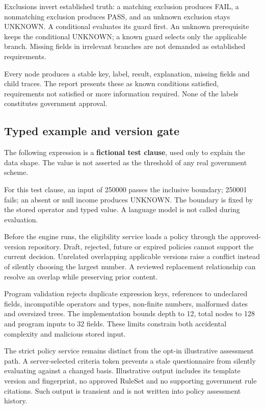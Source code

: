 \documentclass[12pt,a4paper,twoside]{report}
\begin{document}
Exclusions invert established truth: a matching exclusion produces FAIL, a nonmatching exclusion produces PASS, and an unknown exclusion stays UNKNOWN. A conditional evaluates its guard first. An unknown prerequisite keeps the conditional UNKNOWN; a known guard selects only the applicable branch. Missing fields in irrelevant branches are not demanded as established requirements.

Every node produces a stable key, label, result, explanation, missing fields and child traces. The report presents these as known conditions satisfied, requirements not satisfied or more information required. None of the labels constitutes government approval.

\subsection*{Typed example and version gate}

The following expression is a \textbf{fictional test clause}, used only to explain the data shape. The value is not asserted as the threshold of any real government scheme.

For this test clause, an input of 250000 passes the inclusive boundary; 250001 fails; an absent or null income produces UNKNOWN. The boundary is fixed by the stored operator and typed value. A language model is not called during evaluation.

Before the engine runs, the eligibility service loads a policy through the approved-version repository. Draft, rejected, future or expired policies cannot support the current decision. Unrelated overlapping applicable versions raise a conflict instead of silently choosing the largest number. A reviewed replacement relationship can resolve an overlap while preserving prior content.

Program validation rejects duplicate expression keys, references to undeclared fields, incompatible operators and types, non-finite numbers, malformed dates and oversized trees. The implementation bounds depth to 12, total nodes to 128 and program inputs to 32 fields. These limits constrain both accidental complexity and malicious stored input.

The strict policy service remains distinct from the opt-in illustrative assessment path. A server-selected criteria token prevents a stale questionnaire from silently evaluating against a changed basis. Illustrative output includes its template version and fingerprint, no approved RuleSet and no supporting government rule citations. Such output is transient and is not written into policy assessment history.
\end{document}

